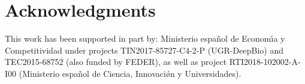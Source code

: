 \documentclass[10pt,journal,compsoc]{IEEEtran}
\begin{document}
\section*{Acknowledgments}

This work has been supported in part by: Ministerio espa\~{n}ol de
Econom\'{\i}a y Competitividad under projects  TIN2017-85727-C4-2-P (UGR-DeepBio) and TEC2015-68752 (also funded by FEDER), as well as project RTI2018-102002-A-I00 (Ministerio espa\~{n}ol de Ciencia, Innovaci\'{\o}n y Universidades).












\end{document}
